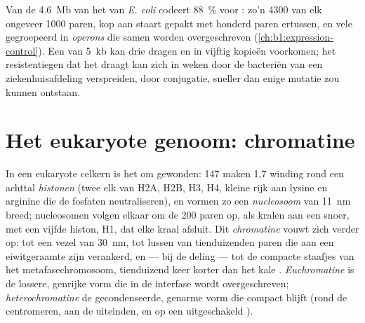\begin{example}\label{ex:b1:genomes:dense}
Van de \qty{4.6}{Mb} van het  van \emph{E. coli} codeert \qty{88}{\%}
voor : zo'n \num{4300}  van elk ongeveer \num{1000} paren, kop aan staart
gepakt met honderd paren ertussen, en vele gegroepeerd in \emph{operons} die samen
worden overgeschreven (\cref{ch:b1:expression-control}). Een  van
\qty{5}{kb} kan drie  dragen en in vijftig kopieën voorkomen; het
resistentiegen dat het draagt kan zich in weken door de bacteriën van een
ziekenhuisafdeling verspreiden, door conjugatie, sneller dan enige mutatie zou
kunnen ontstaan.
\end{example}

\section{Het eukaryote genoom: chromatine}

\begin{definition}\label{def:b1:genomes:nucleosome}
In een eukaryote celkern is het  om  gewonden: \qty{147}{} 
maken 1,7 winding rond een achttal \emph{histonen} (twee elk van H2A, H2B, H3, H4,
kleine  rijk aan lysine en arginine die de fosfaten neutraliseren), en
vormen zo een \emph{nucleosoom} van \qty{11}{nm} breed;
nucleosomen volgen elkaar om de \qty{200}{} paren op, als kralen aan een snoer,
met een vijfde histon, H1, dat elke kraal afsluit. Dit \emph{chromatine} vouwt zich
verder op: tot een vezel van \qty{30}{nm}, tot lussen van tienduizenden paren die
aan een eiwitgeraamte zijn verankerd, en --- bij de deling --- tot de compacte
staafjes van het metafasechromosoom, tienduizend keer korter dan het kale .
\emph{Euchromatine} is de lossere, genrijke vorm die in de interfase wordt
overgeschreven; \emph{heterochromatine} de gecondenseerde, genarme vorm die compact
blijft (rond de centromeren, aan de uiteinden, en op een uitgeschakeld
).
\end{definition}

